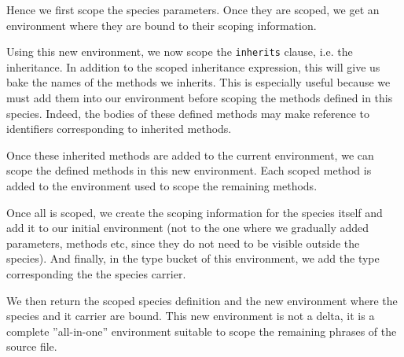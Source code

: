 Hence we first scope the species parameters. Once they are scoped, we
get an environment where they are bound to their scoping information.

Using this new environment, we now scope the {\tt inherits} clause,
i.e. the inheritance. In addition to the scoped inheritance
expression, this will give us bake the names of the methods we
inherits. This is especially useful because we must add them into our
environment before scoping the methods defined in this
species. Indeed, the bodies of these defined methods may make
reference to identifiers corresponding to inherited methods.

Once these inherited methods are added to the current environment, we
can scope the defined methods in this new environment. Each scoped
method is added to the environment used to scope the remaining
methods.

Once all is scoped, we create the scoping information for the species
itself and add it to our initial environment (not to the one where we
gradually added parameters, methods etc, since they do not need to be
visible outside the species). And finally, in the type bucket of this
environment, we add the type corresponding the the species carrier.

We then return the scoped species definition and the new environment
where the species and it carrier are bound. This new environment is
not a delta, it is a complete ''all-in-one'' environment suitable to
scope the remaining phrases of the source file.

